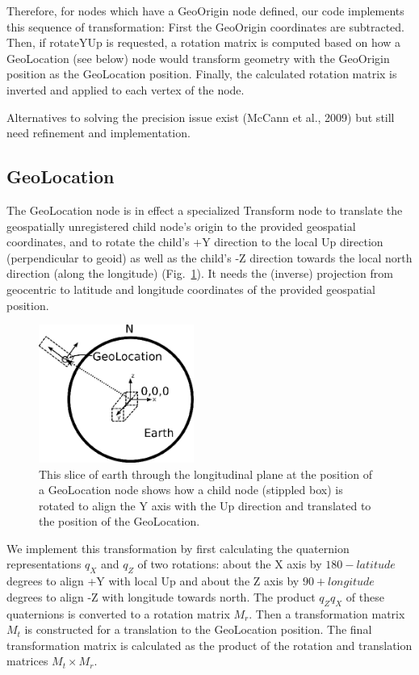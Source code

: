\documentclass{acmsiggraph}                     %
\begin{document}
Therefore, for nodes which have a GeoOrigin node defined, our code implements this sequence of transformation: First the GeoOrigin coordinates are subtracted. Then, if rotateYUp is requested, a rotation matrix is computed based on how a GeoLocation (see below) node would transform geometry with the GeoOrigin position as the GeoLocation position. Finally, the calculated rotation matrix is inverted and applied to each vertex of the node.

Alternatives to solving the precision issue exist \cite{mccann09} (McCann et al., 2009) but still need refinement and implementation.


\subsection{GeoLocation}

The GeoLocation node is in effect a specialized Transform node to translate the geospatially unregistered child node's origin to the provided geospatial coordinates, and to rotate the child's +Y direction to the local Up direction (perpendicular to geoid) as well as the child's -Z direction towards the local north direction (along the longitude) (Fig.~\ref{fig:GeoLocationDiagram}). It needs the (inverse) projection from geocentric to latitude and longitude coordinates of the provided geospatial position.

\begin{figure}[htbp]
\centering
\includegraphics[width=2.0in]{GeoLocationDiagram.png}
\caption{This slice of earth through the longitudinal plane at the position of a GeoLocation node shows how a child node (stippled box) is rotated to align the Y axis with the Up direction and translated to the position of the GeoLocation.}
\label{fig:GeoLocationDiagram}
\end{figure}

We implement this transformation by first calculating the quaternion representations $q_X$ and $q_Z$  of two rotations: about the X axis by $180 - latitude$ degrees to align +Y with local Up and about the Z axis by $90 + longitude$ degrees to align -Z with longitude towards north. The product $q_{Z}q_{X}$ of these quaternions is converted to a rotation matrix $M_r$. Then a transformation matrix $M_t$ is constructed for a translation to the GeoLocation position. The final transformation matrix is calculated as the product of the rotation and translation matrices $M_t \times M_r$.
\end{document}
